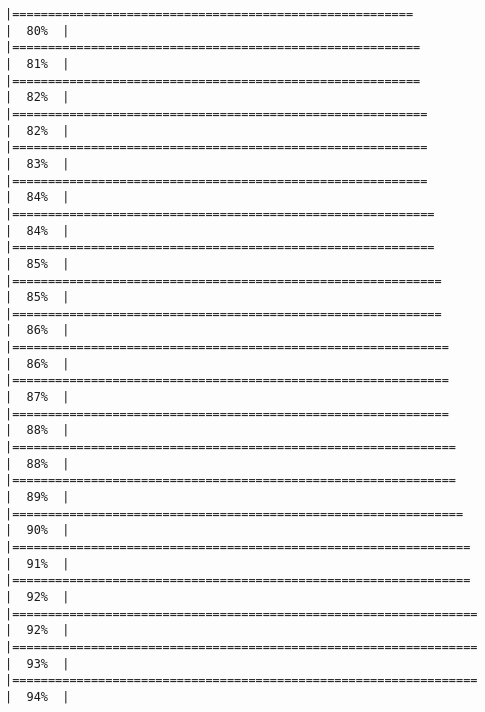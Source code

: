\documentclass[
]{article}
\begin{document}
\begin{verbatim}
|========================================================              |  80%  |                                                                              |=========================================================             |  81%  |                                                                              |=========================================================             |  82%  |                                                                              |==========================================================            |  82%  |                                                                              |==========================================================            |  83%  |                                                                              |==========================================================            |  84%  |                                                                              |===========================================================           |  84%  |                                                                              |===========================================================           |  85%  |                                                                              |============================================================          |  85%  |                                                                              |============================================================          |  86%  |                                                                              |=============================================================         |  86%  |                                                                              |=============================================================         |  87%  |                                                                              |=============================================================         |  88%  |                                                                              |==============================================================        |  88%  |                                                                              |==============================================================        |  89%  |                                                                              |===============================================================       |  90%  |                                                                              |================================================================      |  91%  |                                                                              |================================================================      |  92%  |                                                                              |=================================================================     |  92%  |                                                                              |=================================================================     |  93%  |                                                                              |=================================================================     |  94%  |                                                                              
\end{verbatim}
\end{document}
